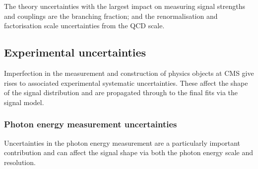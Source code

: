 The theory uncertainties with the largest impact on measuring signal strengths and couplings are the \Hgg branching fraction; and the renormalisation and factorisation scale uncertainties from the QCD scale. 



\subsection{Experimental uncertainties}
Imperfection in the measurement and construction of physics objects at CMS give rises to associated experimental systematic uncertainties. 
These affect the shape of the signal distribution and are propagated through to the final fits via the signal model. 
\subsubsection{Photon energy measurement uncertainties}
Uncertainties in the photon energy measurement are a particularly important contribution and can affect the signal shape via both the photon energy scale and resolution.
